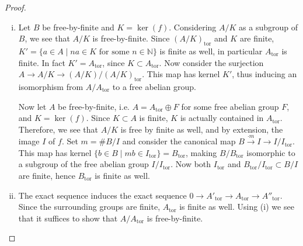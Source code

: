 \begin{proof}
\begin{enumerate}[(i)]
\item Let $B$ be free-by-finite and $K = \ker(f)$. Considering $A/K$ as a subgroup of $B$, we see that $A/K$ is free-by-finite. Since $(A/K)_\text{tor}$ and $K$ are finite, $K' = \{a\in A\mid na\in K \text{ for some }n\in\mathbb{N}\}$ is finite as well, in particular $A_\text{tor}$ is finite. In fact $K'=A_\text{tor}$, since $K\subset A_\text{tor}$. Now consider the surjection $A\to A/K\to (A/K)/(A/K)_\text{tor}$. This map has kernel $K'$, thus inducing an isomorphism from $A/A_\text{tor}$ to a free abelian group.

Now let $A$ be free-by-finite, i.e. $A = A_\text{tor} \oplus F$ for some free abelian group $F$, and $K=\ker(f)$. Since $K\subset A$ is finite, $K$ is actually contained in $A_\text{tor}$. Therefore, we see that $A/K$ is free by finite as well, and by extension, the image $I$ of $f$. Set $m = \#B/I$ and consider the canonical map $B\stackrel{\cdot m}{\to} I \to I/I_\text{tor}$. This map has kernel $\{b\in B \mid mb \in I_\text{tor}\} = B_\text{tor}$, making $B/B_\text{tor}$ isomorphic to a subgroup of the free abelian group $I/I_\text{tor}$. Now both $I_\text{tor}$ and $B_\text{tor}/I_\text{tor} \subset B/I$ are finite, hence $B_\text{tor}$ is finite as well.
\item The exact sequence induces the exact sequence $0 \longrightarrow A'_\text{tor} \longrightarrow A_\text{tor} \longrightarrow A''_\text{tor}$. Since the surrounding groups are finite, $A_\text{tor}$ is finite as well. Using (i) we see that it suffices to show that $A/A_\text{tor}$ is free-by-finite. 


\end{enumerate}
\end{proof}
